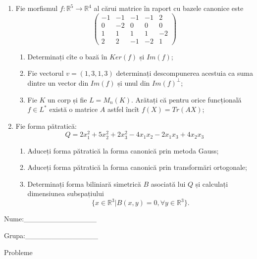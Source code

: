 \documentclass{article}
\begin{document}
\begin{enumerate}
 \item Fie morfismul $f:\mathbb{R}^5 \to \mathbb{R}^4$ al cărui matrice în raport cu bazele canonice este
$$\begin{pmatrix}
-1&-1&-1&-1&2\\
0&-2&0&0&0\\
1&1&1&1&-2\\
2&2&-1&-2&1
\end{pmatrix}$$

\begin{enumerate}
\item Determinați cîte o bază în $Ker(f)$ și $Im(f)$;
\item Fie vectorul $v=(1,3,1,3)$ determinați descompunerea acestuia ca suma dintre un vector din $Im(f)$ și unul din $Im(f)^\perp$;
\item Fie $K$ un corp și fie $L=M_n(K)$. Arătați că pentru orice funcțională $f \in L^*$ există o matrice $A$ astfel încît $f(X)=Tr(AX)$;
\end{enumerate}
\item Fie forma pătratică:
$$Q= 2x_1^2+5x_2^2+2x_3^2-4x_1x_2-2x_1x_3+4x_2x_3$$

\begin{enumerate}
\item Aduceți forma pătratică la forma canonică prin metoda Gauss;
\item Aduceți forma pătratică la forma canonică prin transformări ortogonale;
\item Determinați forma biliniară simetrică $B$ asociată lui $Q$ și calculați dimensiunea subspațiului
$$\{x \in \mathbb{R}^3 | B(x,y)=0,\forall y \in \mathbb{R}^3\}.$$

\end{enumerate}
\end{enumerate}
\newpage
\begin{flushright}
Nume:\_\_\_\_\_\_\_\_\_\_\_\_\_\_
 
 
Grupa:\_\_\_\_\_\_\_\_\_\_\_\_\_\_
\end{flushright}
\begin{center}
\vspace{2cm}
{\Large Probleme}
\vspace{2cm}
\end{center}
\end{document}
